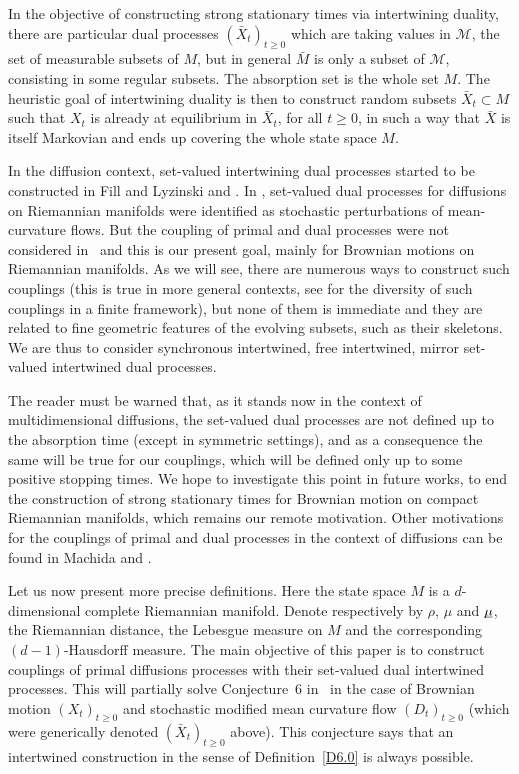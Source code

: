 \documentclass[10pt]{amsart}
\theoremstyle{plain}
\theoremstyle{definition}
\newcommand{\usm}{{\underline{\smash{\mu}}}}
\newcommand{\cM}{\mathcal{M}}
\begin{document}
In the objective of constructing strong stationary times via intertwining duality, there are particular dual processes $(\bar X_t)_{t\geq 0}$ which are taking values in $\cM$, the set of measurable subsets of $M$, but in general $\bar M$ is only a subset of $\cM$, consisting in some regular subsets.
The absorption set is the whole set $M$. The heuristic goal of intertwining duality is then to construct random subsets $\bar X_t\subset M$ such that $X_t$ is already at equilibrium in $\bar X_t$, for all $t\geq 0$, in such a way that $\bar X$ is itself Markovian and ends up covering the whole state space $M$.
\par
In the diffusion context, set-valued intertwining dual processes started to be constructed in Fill and Lyzinski \cite{MR3571247} and \cite{MR3634282}.
In \cite{zbMATH07470497}, set-valued dual processes for diffusions on Riemannian manifolds were identified as stochastic perturbations of mean-curvature flows.
But the coupling of primal and dual processes were not considered in~\cite{zbMATH07470497} and this is our present goal, mainly for Brownian motions on Riemannian manifolds.
As we will see, there are numerous ways to construct such couplings (this is true in more general contexts, see \cite{Mic2020} for the diversity of such couplings in a finite framework), but none of them is immediate and they are related to fine geometric features of the evolving subsets, such as their skeletons.
We are thus to consider synchronous intertwined, free intertwined, mirror set-valued intertwined dual processes. \par
The reader must be warned that, as it stands now in the context of multidimensional diffusions, the set-valued dual processes are not defined up to the absorption time (except in symmetric settings), and as a consequence the same will be true for our couplings, which will be defined only up to some positive stopping times.
We hope to investigate this point in future works, to end the construction of strong stationary times for Brownian motion on compact Riemannian manifolds, which remains our remote motivation. Other motivations for the couplings of primal and dual processes in the context of diffusions can be found in Machida \cite{2019arXiv190807559M} and \cite{Mic2020}.

Let us now present more precise definitions. Here the state space $M$ is a $d$\nobreakdash-di\-men\-sional complete Riemannian manifold. Denote respectively by $\rho$, $\mu$ and $\usm$, the Riemannian distance, the Lebesgue measure on $M$ and the corresponding $(d-1)$-Hausdorff measure. The main objective of this paper is to construct couplings of primal diffusions processes with their set-valued dual intertwined processes. This will partially solve Conjecture~6 in~\cite{zbMATH07470497} in the case of Brownian motion $(X_t)_{t\ge 0}$ and stochastic modified mean curvature flow $(D_t)_{t\ge 0}$ (which were generically denoted $(\bar X_t)_{t\ge 0}$ above). This conjecture says that an intertwined construction in the sense of Definition~\ref{D6.0} is always possible.
\end{document}
